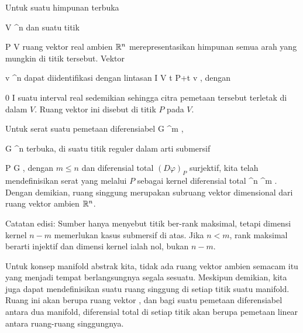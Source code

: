 \setcounter{section}{9}


Untuk suatu himpunan terbuka

\mavergleichskette
{\vergleichskette
{V
}
{ \subseteq }{ \R^n
}
{  }{
}
{    }{
}
{   }{
}
}
{}{}{}
dan suatu titik

\mavergleichskette
{\vergleichskette
{P
}
{ \in }{V
}
{  }{
}
{    }{
}
{   }{
}
}
{}{}{}
ruang vektor real ambien ${\mathbb R}^n$ merepresentasikan himpunan semua arah yang mungkin di titik tersebut. Vektor

\mavergleichskette
{\vergleichskette
{v
}
{ \in }{ \R^n
}
{  }{
}
{    }{
}
{   }{
}
}
{}{}{}
dapat diidentifikasi dengan lintasan
\maabbeledisp {} {I} {V
} {t} { P+t v
} {,}
dengan

\mavergleichskette
{\vergleichskette
{ 0
}
{ \in }{ I
}
{  }{
}
{    }{
}
{   }{
}
}
{}{}{}
suatu interval real sedemikian sehingga citra pemetaan tersebut terletak di dalam $V$. Ruang vektor ini disebut  {} di titik $P$ pada $V$.

Untuk serat suatu pemetaan diferensiabel
\maabb {\varphi} {G} {\R^m
} {,}

\mavergleichskette
{\vergleichskette
{G
}
{ \subseteq }{ \R^n
}
{  }{
}
{    }{
}
{   }{
}
}
{}{}{}
terbuka, di suatu titik reguler dalam arti submersif

\mavergleichskette
{\vergleichskette
{P
}
{ \in }{G
}
{  }{
}
{    }{
}
{   }{
}
}
{}{}{}, dengan $m\leq n$ dan diferensial total $(D\varphi)_P$ surjektif, kita telah mendefinisikan
serat yang melalui $P$ sebagai kernel diferensial total
 {\R^n } { \R^m
} {}.
Dengan demikian, ruang singgung merupakan subruang vektor
dimensional dari ruang vektor ambien ${\mathbb R}^n$.

Catatan edisi: Sumber hanya menyebut titik ber-rank maksimal, tetapi dimensi kernel $n-m$ memerlukan kasus submersif di atas. Jika $n<m$, rank maksimal berarti injektif dan dimensi kernel ialah nol, bukan $n-m$.

Untuk konsep manifold abstrak kita, tidak ada ruang vektor ambien semacam itu yang menjadi tempat berlangsungnya segala sesuatu. Meskipun demikian, kita juga dapat mendefinisikan suatu ruang singgung di setiap titik suatu manifold. Ruang ini akan berupa ruang vektor
 {} {,}
dan bagi suatu pemetaan diferensiabel antara dua manifold, diferensial total di setiap titik akan berupa pemetaan linear antara ruang-ruang singgungnya.

